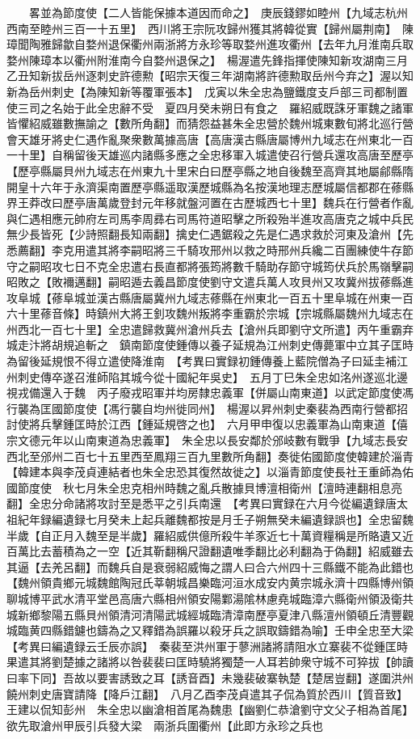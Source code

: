 　　畧並為節度使【二人皆能保據本道因而命之】　庚辰錢鏐如睦州【九域志杭州西南至睦州三百一十五里】　西川將王宗阮攻歸州獲其將韓從實【歸州屬荆南】　陳璋聞陶雅歸歙自婺州退保衢州兩浙將方永珍等取婺州進攻衢州【去年九月淮南兵取婺州陳璋本以衢州附淮南今自婺州退保之】　楊渥遣先鋒指揮使陳知新攻湖南三月乙丑知新拔岳州逐刺史許德勲【昭宗天復三年湖南將許德勲取岳州今弃之】渥以知新為岳州刺史【為陳知新等覆軍張本】　戊寅以朱全忠為鹽鐵度支戶部三司都制置使三司之名始于此全忠辭不受　夏四月癸未朔日有食之　羅紹威既誅牙軍魏之諸軍皆懼紹威雖數撫諭之【數所角翻】而猜怨益甚朱全忠營於魏州城東數旬將北巡行營會天雄牙將史仁遇作亂聚衆數萬據高唐【高唐漢古縣唐屬博州九域志在州東北一百一十里】自稱留後天雄巡内諸縣多應之全忠移軍入城遣使召行營兵還攻高唐至歷亭【歷亭縣屬貝州九域志在州東九十里宋白曰歷亭縣之地自後魏至高齊其地屬鄃縣隋開皇十六年于永濟渠南置歷亭縣遥取漢歷城縣為名按漢地理志歷城屬信都郡在蓚縣界王莽改曰歷亭唐萬歲登封元年移就盤河置在古歷城西七十里】魏兵在行營者作亂與仁遇相應元帥府左司馬李周彞右司馬符道昭擊之所殺殆半進攻高唐克之城中兵民無少長皆死【少詩照翻長知兩翻】擒史仁遇鋸殺之先是仁遇求救於河東及滄州【先悉薦翻】李克用遣其將李嗣昭將三千騎攻邢州以救之時邢州兵纔二百團練使牛存節守之嗣昭攻七日不克全忠遣右長直都將張筠將數千騎助存節守城筠伏兵於馬嶺擊嗣昭敗之【敗襧邁翻】嗣昭遁去義昌節度使劉守文遣兵萬人攻貝州又攻冀州拔蓚縣進攻阜城【蓚阜城並漢古縣唐屬冀州九域志蓚縣在州東北一百五十里阜城在州東一百六十里蓚音條】時鎮州大將王釗攻魏州叛將李重霸於宗城【宗城縣屬魏州九域志在州西北一百七十里】全忠遣歸救冀州滄州兵去【滄州兵即劉守文所遣】丙午重霸弃城走汴將胡規追斬之　鎮南節度使鍾傳以養子延規為江州刺史傳薨軍中立其子匡時為留後延規恨不得立遣使降淮南　【考異曰實録初鍾傳養上藍院僧為子曰延圭補江州刺史傳卒遂召淮師陷其城今從十國紀年吳史】　五月丁巳朱全忠如洺州遂巡北邊視戎備還入于魏　丙子廢戎昭軍并均房隸忠義軍【併屬山南東道】以武定節度使馮行襲為匡國節度使【馮行襲自均州徙同州】　楊渥以昇州刺史秦裴為西南行營都招討使將兵擊鍾匡時於江西【鍾延規啓之也】　六月甲申復以忠義軍為山南東道【僖宗文德元年以山南東道為忠義軍】　朱全忠以長安鄰於邠岐數有戰爭【九域志長安西北至邠州二百七十五里西至鳳翔三百九里數所角翻】奏徙佑國節度使韓建於淄青【韓建本與李茂貞連結者也朱全忠恐其復然故徙之】以淄青節度使長社王重師為佑國節度使　秋七月朱全忠克相州時魏之亂兵散據貝博澶相衛州【澶時連翻相息亮翻】全忠分命諸將攻討至是悉平之引兵南還　【考異曰實録在六月今從編遺録唐太祖紀年録編遺録七月癸未上起兵離魏都按是月壬子朔無癸未編遺録誤也】全忠留魏半歲【自正月入魏至是半歲】羅紹威供億所殺牛羊豕近七十萬資糧稱是所賂遺又近百萬比去蓄積為之一空【近其靳翻稱尺證翻遺唯季翻比必利翻為于偽翻】紹威雖去其逼【去羌呂翻】而魏兵自是衰弱紹威悔之謂人曰合六州四十三縣鐵不能為此錯也【魏州領貴鄉元城魏館陶冠氏莘朝城昌樂臨河洹水成安内黄宗城永濟十四縣博州領聊城博平武水清平堂邑高唐六縣相州領安陽鄴湯隂林慮堯城臨漳六縣衛州領汲衛共城新鄉黎陽五縣貝州領清河清陽武城經城臨清漳南歷亭夏津八縣澶州領頓丘清豐觀城臨黄四縣錯鑢也鑄為之又釋錯為誤羅以殺牙兵之誤取鑄錯為喻】壬申全忠至大梁　【考異曰編遺録云壬辰亦誤】　秦裴至洪州軍于蓼洲諸將請阻水立寨裴不從鍾匡時果遣其將劉楚據之諸將以咎裴裴曰匡時驍將獨楚一人耳若帥衆守城不可猝拔【帥讀曰率下同】吾故以要害誘致之耳【誘音酉】未幾裴破寨執楚【楚居豈翻】遂圍洪州饒州刺史唐寶請降【降戶江翻】　八月乙酉李茂貞遣其子侃為質於西川【質音致】王建以侃知彭州　朱全忠以幽滄相首尾為魏患【幽劉仁恭滄劉守文父子相為首尾】欲先取滄州甲辰引兵發大梁　兩浙兵圍衢州【此即方永珍之兵也
